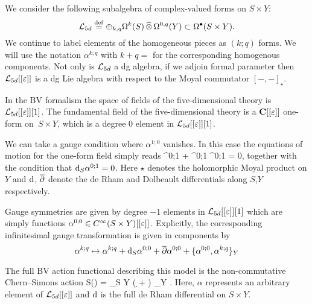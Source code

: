 \documentclass[11pt]{amsart}%
\begin{document}
We consider the following subalgebra of complex-valued forms on $S\times Y$:
\[
\mathcal L_{5d} \overset{\rm def}{=} \oplus_{k,q}\Omega^{k}(S)\, \widehat{\otimes} \, \Omega^{0,q}(Y) \subset \Omega^\bullet(S \times Y) .
\]
We continue to label elements of the homogeneous pieces as $(k;q)$ forms.
We will use the notation $\alpha^{k;q}$ with $k+q=$ for the corresponding homogenous components.
Not only is $\mathcal L_{5d}$ a dg algebra, if we adjoin formal parameter then $\mathcal L_{5d}[[\varepsilon]]$ is a dg Lie algebra with respect to the Moyal commutator $[-,-]_\star$.

In the BV formalism the space of fields of the five-dimensional theory is $\mathcal L_{5d}[[\varepsilon]] [1]$. 
The fundamental field of the five-dimensional theory is a $\mathbf{C}[[\varepsilon]]$ one-form on~$S \times Y$, which is a degree $0$ element in $\mathcal L_{5d}[[\varepsilon]] [1]$.

We can take a gauge condition where $\alpha^{1;0}$ vanishes.
In this case the equations of motion for the one-form field simply reads
\beqn
\dbar \alpha^{0;1} + \alpha^{0;1} \star \alpha^{0;1} = 0,
\eeqn
together with the condition that ${\rm d}_S \alpha^{0;1} = 0$.
Here $\star$ denotes the holomorphic Moyal product on $Y$ and ${\rm d}$, $\overline{\partial}$ denote the de Rham and Dolbeault differentials along $S$,$Y$ respectively.

%

Gauge symmetries are given by degree $-1$ elements in $\mathcal L_{5d}[[\varepsilon]][1]$ which are simply functions $\alpha^{0;0} \in C^\infty (S\times Y)[[\varepsilon]]$. 
Explicitly, the corresponding infinitesimal gauge transformation is given in components by
\[
\alpha^{k;q}\mapsto \alpha^{k;q} + {\rm d}_S \alpha^{0;0} +\overline{\partial} \alpha^{0;0} + \{\alpha^{0;0}, \alpha^{k;q}\}_{Y}
\]

The full BV action functional describing this model is the non-commutative Chern--Simons action
\beqn
S(\alpha) = \int_{S \times Y} \left( \alpha \d \alpha +  \alpha \star \alpha \star \alpha \right) \wedge \Omega_Y .
\eeqn
Here, $\alpha$ represents an arbitrary element of $\mathcal L_{5d}[[\varepsilon]]$ and ${\rm d}$ is the full de Rham differential on $S \times Y$.

\end{document}
